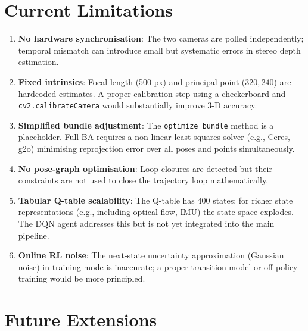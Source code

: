 \documentclass[12pt,a4paper,twoside]{report}
\theoremstyle{definition}
\newcommand{\code}[1]{\texttt{#1}}
\begin{document}
\section{Current Limitations}

\begin{enumerate}
  \item \textbf{No hardware synchronisation}: The two cameras are polled
        independently; temporal mismatch can introduce small but systematic
        errors in stereo depth estimation.

  \item \textbf{Fixed intrinsics}: Focal length (500 px) and principal point
        ($320, 240$) are hardcoded estimates. A proper calibration step using a
        checkerboard and \code{cv2.calibrateCamera} would substantially improve
        3-D accuracy.

  \item \textbf{Simplified bundle adjustment}: The \code{optimize\_bundle}
        method is a placeholder. Full BA requires a non-linear least-squares
        solver (e.g., Ceres, g2o) minimising reprojection error over all
        poses and points simultaneously.

  \item \textbf{No pose-graph optimisation}: Loop closures are detected but their
        constraints are not used to close the trajectory loop mathematically.

  \item \textbf{Tabular Q-table scalability}: The Q-table has $400$ states;
        for richer state representations (e.g., including optical flow, IMU) the
        state space explodes. The DQN agent addresses this but is not yet
        integrated into the main pipeline.

  \item \textbf{Online RL noise}: The next-state uncertainty approximation
        (Gaussian noise) in training mode is inaccurate; a proper transition
        model or off-policy training would be more principled.
\end{enumerate}

\section{Future Extensions}
\end{document}
